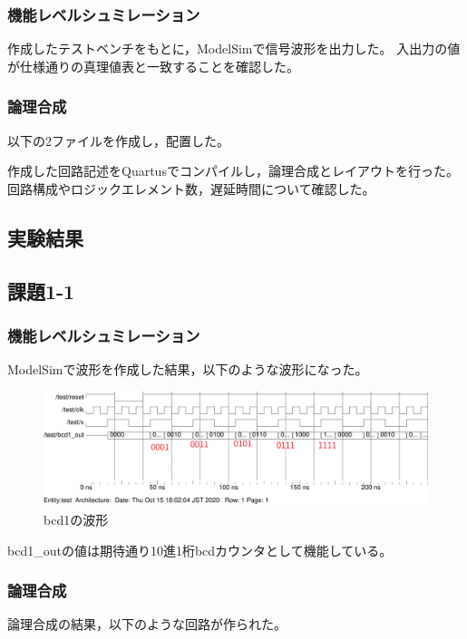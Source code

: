 \subsubsection{機能レベルシュミレーション}
作成したテストベンチをもとに，ModelSimで信号波形を出力した。
入出力の値が仕様通りの真理値表と一致することを確認した。

\subsubsection{論理合成}
以下の2ファイルを作成し，配置した。



作成した回路記述をQuartusでコンパイルし，論理合成とレイアウトを行った。
回路構成やロジックエレメント数，遅延時間について確認した。

\subsection{実験結果}
\subsection*{課題1-1}
\subsubsection{機能レベルシュミレーション}
ModelSimで波形を作成した結果，以下のような波形になった。

\begin{figure}[H]
  \centering
  \includegraphics[width=\linewidth]{./src/bcd/bcd1wave.png}
  \caption{bcd1の波形}
\end{figure}

bcd1\_outの値は期待通り10進1桁bcdカウンタとして機能している。

\subsubsection{論理合成}
論理合成の結果，以下のような回路が作られた。

